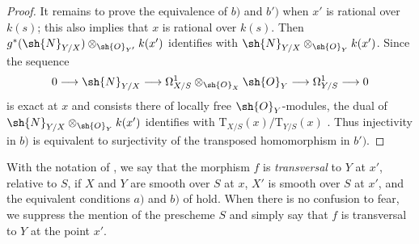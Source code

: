 \begin{proof}
It remains to prove the equivalence of $b)$ and $b')$ when $x'$ is rational over $k(s)$; this also implies that $x$ is rational over $k(s)$.
Then $g^*(\sh{N}_{Y/X})\otimes_{\sh{O}_{Y'}}k(x')$ identifies with
$\sh{N}_{Y/X}\otimes_{\sh{O}_Y}k(x')$.
Since the sequence
\[
  0\longrightarrow\sh{N}_{Y/X}
  \longrightarrow\Omega^1_{X/S}\otimes_{\sh{O}_X}\sh{O}_Y
  \longrightarrow\Omega^1_{Y/S}\longrightarrow0
\]
is exact at $x$ and consists there of locally free $\sh{O}_Y$-modules, the dual of
$\sh{N}_{Y/X}\otimes_{\sh{O}_Y}k(x')$ identifies with
$\mathrm{T}_{X/S}(x)/\mathrm{T}_{Y/S}(x)$ .
Thus injectivity in $b)$ is equivalent to surjectivity of the transposed homomorphism in $b')$.
\end{proof}

\begin{definition}[17.13.3]
\label{IV.17.13.3}
With the notation of , we say that the morphism $f$ is \emph{transversal} to $Y$ at $x'$, relative to $S$, if $X$ and $Y$ are smooth over $S$ at $x$, $X'$ is smooth over $S$ at $x'$, and the equivalent conditions $a)$ and $b)$ of  hold.
When there is no confusion to fear, we suppress the mention of the prescheme $S$ and simply say that $f$ is transversal to $Y$ at the point $x'$.
\end{definition}

